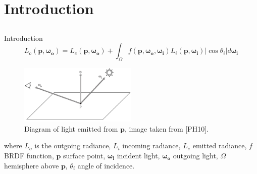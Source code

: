 \documentclass{beamer}
\begin{document}
\section{Introduction}
\subsection{ }

\begin{frame}{Introduction}
\begin{equation*}  
L_o (\mathbf{p}, \boldsymbol{\omega_o}) = L_e(\mathbf{p}, \boldsymbol{\omega_o}) + \int_\Omega f(\mathbf{p}, \boldsymbol{\omega_o}, \boldsymbol{\omega_i}) L_i(\mathbf{p}, \boldsymbol{\omega_i}) | \cos \theta_i | d \boldsymbol{\omega_i}
\end{equation*}

\begin{multicols}{2}
\begin{figure}[b!]
\includegraphics[width=0.5\textwidth]{img/render_definition}
\caption*{\tiny{Diagram of light emitted from $\mathbf{p}$, image taken from [PH10].}}
\end{figure}

\vfill
\columnbreak
\vspace*{\fill}
\small{where $L_o$ is the outgoing radiance, $L_i$ incoming radiance, $L_e$ emitted radiance, $f$ BRDF function, $\mathbf{p}$ surface point, $\boldsymbol{\omega_i}$ incident light, $\boldsymbol{\omega_o}$ outgoing light, $\Omega$ hemisphere above $\mathbf{p}$, $\theta_i$ angle of incidence. }
\end{multicols}
\end{frame}
\end{document}
